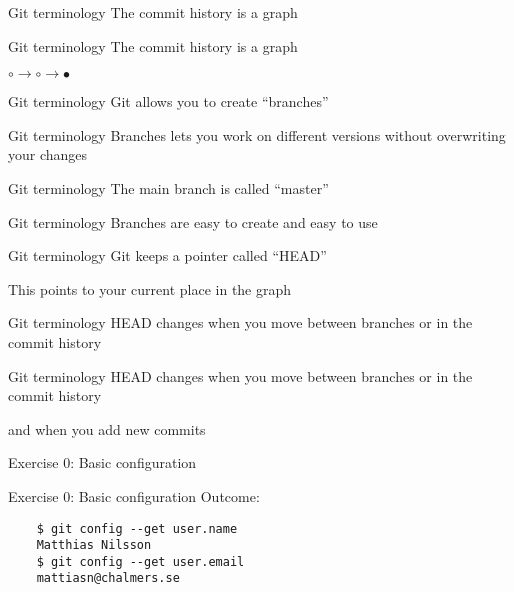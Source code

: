 \documentclass{beamer}
\begin{document}
\begin{frame}{Git terminology}
  \center
  \Huge The commit history is a graph
\end{frame}

\begin{frame}{Git terminology}
  \center
  \Huge The commit history is a graph

  \Large $ \circ \rightarrow \circ \rightarrow \bullet $
\end{frame}

\begin{frame}{Git terminology}
  \center
  \Huge Git allows you to create ``branches''
\end{frame}

\begin{frame}{Git terminology}
  \center
  \Huge Branches lets you work on different versions without overwriting your changes
\end{frame}

\begin{frame}{Git terminology}
  \center
  \Huge The main branch is called ``master''
\end{frame}

\begin{frame}{Git terminology}
  \center
  \Huge Branches are easy to create and easy to use
\end{frame}

\begin{frame}{Git terminology}
  \center
  \Huge Git keeps a pointer called ``HEAD''

  \Large This points to your current place in the graph
\end{frame}

\begin{frame}{Git terminology}
  \center
  \Huge HEAD changes when you move between branches or in the commit history
\end{frame}

\begin{frame}{Git terminology}
  \center
  \Huge HEAD changes when you move between branches or in the commit history

  \huge and when you add new commits
\end{frame}

\begin{frame}{}
  \center
  \Huge Exercise 0: Basic configuration
\end{frame}

\begin{frame}[fragile]{Exercise 0: Basic configuration}
  Outcome:

  \begin{verbatim}
    $ git config --get user.name
    Matthias Nilsson
    $ git config --get user.email
    mattiasn@chalmers.se
  \end{verbatim}
\end{frame}
\end{document}
